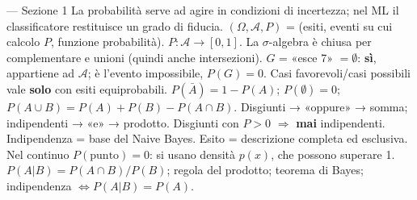 \begin{appunti}{— Sezione 1}
 La probabilità serve ad agire in condizioni di incertezza; nel ML il classificatore restituisce un grado di fiducia.
 $(\Omega,\mathcal{A},P)$ = (esiti, eventi su cui calcolo $P$, funzione probabilità). $P:\mathcal{A}\to[0,1]$. La $\sigma$-algebra è chiusa per complementare e unioni (quindi anche intersezioni).
 $G$ = «esce 7» $=\emptyset$: \textbf{sì}, appartiene ad $\mathcal{A}$; è l'evento impossibile, $P(G)=0$.
 Casi favorevoli/casi possibili vale \textbf{solo} con esiti equiprobabili.
 $P(\bar A)=1-P(A)$; $P(\emptyset)=0$; $P(A\cup B)=P(A)+P(B)-P(A\cap B)$.
 Disgiunti → «oppure» → somma; indipendenti → «e» → prodotto. Disgiunti con $P>0$ $\Rightarrow$ \textbf{mai} indipendenti. Indipendenza = base del Naive Bayes.
 Esito = descrizione completa ed esclusiva. Nel continuo $P(\text{punto})=0$: si usano densità $p(x)$, che possono superare 1.
 $P(A|B)=P(A\cap B)/P(B)$; regola del prodotto; teorema di Bayes; indipendenza $\iff P(A|B)=P(A)$.
\end{appunti}
